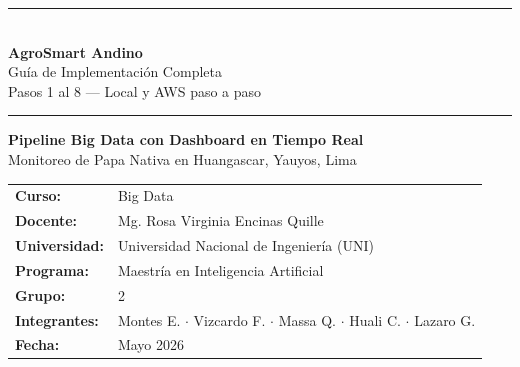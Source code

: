 \documentclass[11pt,a4paper]{article}
\begin{document}

\begin{titlepage}
  \centering
  \vspace*{1cm}
  {\color{agroverde}\rule{\linewidth}{2pt}}\\[0.5em]
  {\huge\bfseries\color{agroverde} AgroSmart Andino}\\[0.3em]
  {\large\color{agroverde} Gu\'ia de Implementaci\'on Completa}\\[0.3em]
  {\normalsize\color{agrogris} Pasos 1 al 8 --- Local y AWS paso a paso}\\[0.3em]
  {\color{agroverde}\rule{\linewidth}{2pt}}

  \vspace{1.5cm}
  \begin{tcolorbox}[colback=agroverde!5, colframe=agroverde,
    arc=6pt, boxrule=1pt]
    \begin{center}
      \textbf{Pipeline Big Data con Dashboard en Tiempo Real}\\[0.3em]
      \normalsize
      Monitoreo de Papa Nativa en Huangascar, Yauyos, Lima\\[0.5em]
      \begin{tabular}{ll}
        \textbf{Curso:} & Big Data\\
        \textbf{Docente:} & Mg. Rosa Virginia Encinas Quille\\
        \textbf{Universidad:} & Universidad Nacional de Ingenier\'ia (UNI)\\
        \textbf{Programa:} & Maestr\'ia en Inteligencia Artificial\\
        \textbf{Grupo:} & 2\\
        \textbf{Integrantes:} & Montes E. $\cdot$ Vizcardo F. $\cdot$ Massa Q.
                                $\cdot$ Huali C. $\cdot$ Lazaro G.\\
        \textbf{Fecha:} & Mayo 2026\\
      \end{tabular}
    \end{center}
  \end{tcolorbox}


\end{titlepage}
\end{document}
